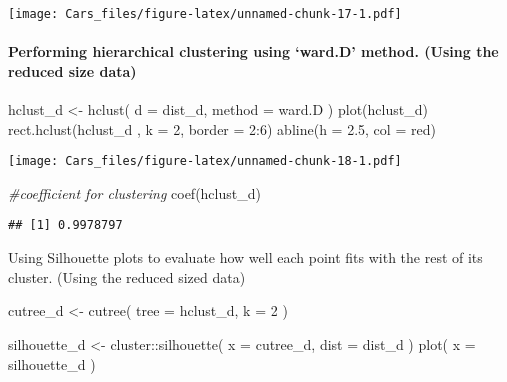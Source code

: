 \documentclass[
]{article}
\newenvironment{Shaded}{\begin{snugshade}}{\end{snugshade}}
\newcommand{\AttributeTok}[1]{\textcolor[rgb]{0.77,0.63,0.00}{#1}}
\newcommand{\CommentTok}[1]{\textcolor[rgb]{0.56,0.35,0.01}{\textit{#1}}}
\newcommand{\DecValTok}[1]{\textcolor[rgb]{0.00,0.00,0.81}{#1}}
\newcommand{\FloatTok}[1]{\textcolor[rgb]{0.00,0.00,0.81}{#1}}
\newcommand{\FunctionTok}[1]{\textcolor[rgb]{0.00,0.00,0.00}{#1}}
\newcommand{\NormalTok}[1]{#1}
\newcommand{\OtherTok}[1]{\textcolor[rgb]{0.56,0.35,0.01}{#1}}
\newcommand{\SpecialCharTok}[1]{\textcolor[rgb]{0.00,0.00,0.00}{#1}}
\newcommand{\StringTok}[1]{\textcolor[rgb]{0.31,0.60,0.02}{#1}}
\begin{document}
\texttt{[image: Cars\_files/figure-latex/unnamed-chunk-17-1.pdf]}

\hypertarget{performing-hierarchical-clustering-using-ward.d-method.-using-the-reduced-size-data}{%
\paragraph{Performing hierarchical clustering using `ward.D' method.
(Using the reduced size
data)}\label{performing-hierarchical-clustering-using-ward.d-method.-using-the-reduced-size-data}}

\begin{Shaded}
\begin{Highlighting}[]
\NormalTok{hclust\_d }\OtherTok{\textless{}{-}} \FunctionTok{hclust}\NormalTok{(}
  \AttributeTok{d =}\NormalTok{ dist\_d,}
  \AttributeTok{method =} \StringTok{\textquotesingle{}ward.D\textquotesingle{}}
\NormalTok{)}
\FunctionTok{plot}\NormalTok{(hclust\_d)}
\FunctionTok{rect.hclust}\NormalTok{(hclust\_d , }\AttributeTok{k =} \DecValTok{2}\NormalTok{, }\AttributeTok{border =} \DecValTok{2}\SpecialCharTok{:}\DecValTok{6}\NormalTok{)}
\FunctionTok{abline}\NormalTok{(}\AttributeTok{h =} \FloatTok{2.5}\NormalTok{, }\AttributeTok{col =} \StringTok{\textquotesingle{}red\textquotesingle{}}\NormalTok{)}
\end{Highlighting}
\end{Shaded}

\texttt{[image: Cars\_files/figure-latex/unnamed-chunk-18-1.pdf]}

\begin{Shaded}
\begin{Highlighting}[]
\CommentTok{\#coefficient for clustering}
\FunctionTok{coef}\NormalTok{(hclust\_d)}
\end{Highlighting}
\end{Shaded}

\begin{verbatim}
## [1] 0.9978797
\end{verbatim}

Using Silhouette plots to evaluate how well each point fits with the
rest of its cluster. (Using the reduced sized data)

\begin{Shaded}
\begin{Highlighting}[]
\NormalTok{cutree\_d }\OtherTok{\textless{}{-}} \FunctionTok{cutree}\NormalTok{(}
  \AttributeTok{tree =}\NormalTok{ hclust\_d,}
  \AttributeTok{k =} \DecValTok{2}
\NormalTok{)}

\NormalTok{silhouette\_d }\OtherTok{\textless{}{-}}\NormalTok{ cluster}\SpecialCharTok{::}\FunctionTok{silhouette}\NormalTok{(}
  \AttributeTok{x =}\NormalTok{ cutree\_d,}
  \AttributeTok{dist =}\NormalTok{ dist\_d}
\NormalTok{)}
\FunctionTok{plot}\NormalTok{(}
  \AttributeTok{x =}\NormalTok{ silhouette\_d}
\NormalTok{)}
\end{Highlighting}
\end{Shaded}
\end{document}
